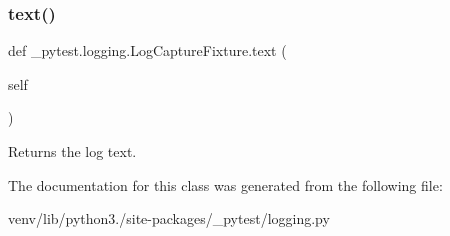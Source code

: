 \subsubsection{\texorpdfstring{text()}{text()}}
{\footnotesize\ttfamily def \+\_\+pytest.\+logging.\+Log\+Capture\+Fixture.\+text (\begin{DoxyParamCaption}\item[{}]{self }\end{DoxyParamCaption})}

\begin{DoxyVerb}Returns the log text.\end{DoxyVerb}
 

The documentation for this class was generated from the following file\+:\begin{DoxyCompactItemize}
\item 
venv/lib/python3./site-\/packages/\+\_\+pytest/logging.\+py\end{DoxyCompactItemize}
